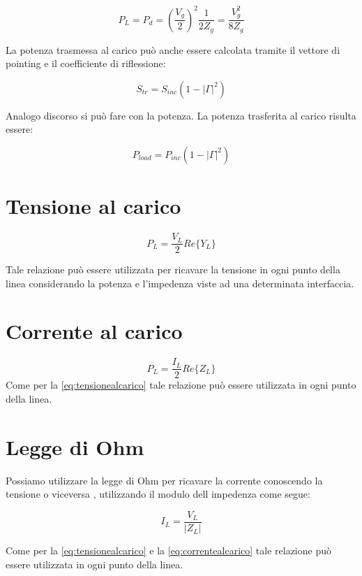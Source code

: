 \documentclass[10pt,a4paper]{report}
\begin{document}
			\begin{equation}
			P_L=P_d=(\frac{V_g}{2})^2\frac{1}{2Z_g}=\frac{V_g^2}{8Z_g}
			\end{equation}

			La potenza trasmessa al carico può anche essere calcolata tramite il vettore di pointing e il coefficiente di riflessione:

			\begin{equation}
			S_{tr}=S_{inc}(1-|\Gamma|^2)
			\end{equation}

			Analogo discorso si può fare con la potenza.
			La potenza trasferita al carico risulta essere:

			\begin{equation}
			P_{load}=P_{inc}(1-|\Gamma|^2)
			\end{equation}
	\section{Tensione al carico}

			\begin{equation}
			P_L=\frac{V_{L}}{2}Re\{Y_L\}
			\label{eq:tensionealcarico}
			\end{equation}

			Tale relazione può essere utilizzata per ricavare la tensione in ogni punto della linea considerando la potenza e l'impedenza viste ad una determinata interfaccia.
	\section{Corrente al carico}


			\begin{equation}
			P_L=\frac{I_{L}}{2}Re\{Z_L\}
			\label{eq:correntealcarico}
			\end{equation}
			Come per la \ref{eq:tensionealcarico} tale relazione può essere utilizzata in ogni punto della linea.
	\section{Legge di Ohm}

	Possiamo utilizzare la legge di Ohm per ricavare la corrente conoscendo la tensione o viceversa , utilizzando il modulo dell impedenza come segue:

	\[
	I_L=\frac{V_L}{|Z_L|}
	\]

			Come per la \ref{eq:tensionealcarico} e la \ref{eq:correntealcarico} tale relazione può essere utilizzata in ogni punto della linea.
\end{document}
